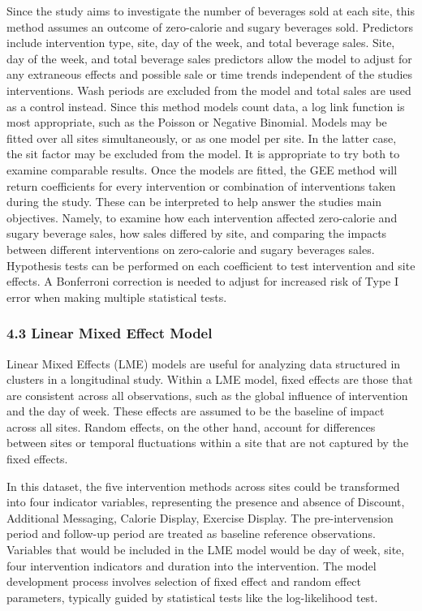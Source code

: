 \documentclass[
]{article}
\begin{document}
Since the study aims to investigate the number of beverages sold at each
site, this method assumes an outcome of zero-calorie and sugary
beverages sold. Predictors include intervention type, site, day of the
week, and total beverage sales. Site, day of the week, and total
beverage sales predictors allow the model to adjust for any extraneous
effects and possible sale or time trends independent of the studies
interventions. Wash periods are excluded from the model and total sales
are used as a control instead. Since this method models count data, a
log link function is most appropriate, such as the Poisson or Negative
Binomial. Models may be fitted over all sites simultaneously, or as one
model per site. In the latter case, the sit factor may be excluded from
the model. It is appropriate to try both to examine comparable results.
Once the models are fitted, the GEE method will return coefficients for
every intervention or combination of interventions taken during the
study. These can be interpreted to help answer the studies main
objectives. Namely, to examine how each intervention affected
zero-calorie and sugary beverage sales, how sales differed by site, and
comparing the impacts between different interventions on zero-calorie
and sugary beverages sales. Hypothesis tests can be performed on each
coefficient to test intervention and site effects. A Bonferroni
correction is needed to adjust for increased risk of Type I error when
making multiple statistical tests.

\hypertarget{linear-mixed-effect-model}{%
\subsubsection{4.3 Linear Mixed Effect
Model}\label{linear-mixed-effect-model}}

Linear Mixed Effects (LME) models are useful for analyzing data
structured in clusters in a longitudinal study. Within a LME model,
fixed effects are those that are consistent across all observations,
such as the global influence of intervention and the day of week. These
effects are assumed to be the baseline of impact across all sites.
Random effects, on the other hand, account for differences between sites
or temporal fluctuations within a site that are not captured by the
fixed effects.

In this dataset, the five intervention methods across sites could be
transformed into four indicator variables, representing the presence and
absence of Discount, Additional Messaging, Calorie Display, Exercise
Display. The pre-intervension period and follow-up period are treated as
baseline reference observations. Variables that would be included in the
LME model would be day of week, site, four intervention indicators and
duration into the intervention. The model development process involves
selection of fixed effect and random effect parameters, typically guided
by statistical tests like the log-likelihood test.
\end{document}
